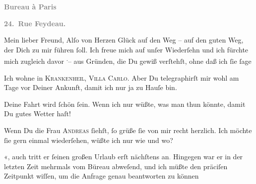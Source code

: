 \pstart
           \begin{otherlanguage}{french}\textcolor{gray}{\textbf{\textbf{Bureau à Paris}}}\end{otherlanguage}\pend
           
\pstart
           \begin{otherlanguage}{french}\textcolor{gray}{\textbf{\textbf{24. Rue Feydeau.}}}\end{otherlanguage}\pend
           
\pstart\center{}Mein lieber Freund,\pend\vspace{0.5em}
\pstart
           Alſo von Herzen Glück auf den Weg – auf den guten Weg, der Dich zu mir führen ſoll.
               Ich freue mich auf unſer Wiederſehn und ich fürchte mich zugleich davor \substVorne{}\textsuperscript{.}\substDazwischen{}–\substHinten{} aus Gründen, die Du gewiß verſtehſt, ohne daß ich ſie ſage{\dotsfive}\pend
           
\pstart
           Ich wohne in \textsc{Krankenheil}, \textsc{Villa Carlo}. Aber Du telegraphirſt mir wohl am Tage vor Deiner Ankunft, {\pb}damit ich nur ja zu Hauſe bin.\pend
           
\pstart
           Deine Fahrt wird ſchön ſein. Wenn ich nur wüßte, was man thun könnte, damit Du gutes
               Wetter haſt!\pend
           
\pstart
           Wenn Du die Frau \textsc{Andreas} ſiehſt, ſo grüße ſie von mir recht herzlich. Ich möchte ſie gern einmal
               wiederſehen, wüßte ich nur wie und wo?\pend
           
\pstart
           \label{K_L02745-1v}\label{K_L02745-1}«, auch tritt er ſeinen großen Urlaub erſt nächſtens an\textcolor{gray}{.}{ }{\pb}Hingegen war er in der letzten Zeit mehrmals vom
                  Büreau abweſend, und ich
               müßte den präciſen Zeitpunkt wiſſen, um die Anfrage  genau beantworten zu können{\dotssix}\pend
           
